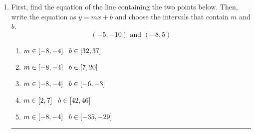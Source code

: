 \documentclass[14pt]{extbook}
\newcommand{\litem}[1]{\item#1\hspace*{-1cm}\rule{\textwidth}{0.4pt}}
\begin{document}
\begin{enumerate}
\litem{
First, find the equation of the line containing the two points below. Then, write the equation as $ y=mx+b $ and choose the intervals that contain $m$ and $b$.\[ (-5, -10) \text{ and } (-8, 5) \]\begin{enumerate}[label=\Alph*.]
\item \( m \in [-8, -4] \hspace*{3mm} b \in [32, 37] \)
\item \( m \in [-8, -4] \hspace*{3mm} b \in [7, 20] \)
\item \( m \in [-8, -4] \hspace*{3mm} b \in [-6, -3] \)
\item \( m \in [2, 7] \hspace*{3mm} b \in [42, 46] \)
\item \( m \in [-8, -4] \hspace*{3mm} b \in [-35, -29] \)

\end{enumerate} }
\end{enumerate}
\end{document}
